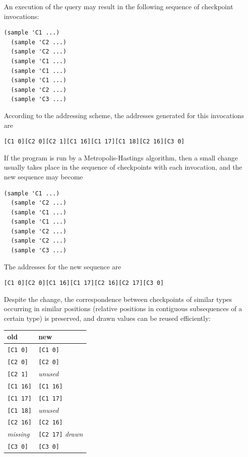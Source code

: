 \documentclass[preprint]{sigplanconf}
\begin{document}
An execution of the query may result in the following
sequence of checkpoint invocations:
\begin{lstlisting}[style=default]
  (sample 'C1 ...)
  (sample 'C2 ...)
  (sample 'C2 ...)
  (sample 'C1 ...)
  (sample 'C1 ...)
  (sample 'C1 ...)
  (sample 'C2 ...)
  (sample 'C3 ...)
\end{lstlisting}
According to the addressing scheme, the addresses generated
for this invocations are
\begin{lstlisting}[style=default]
  [C1 0][C2 0][C2 1][C1 16][C1 17][C1 18][C2 16][C3 0]
\end{lstlisting}
If the program is run by a Metropolis-Hastings algorithm, then a
small change usually takes place in the sequence of checkpoints
with each invocation, and the new sequence may become
\begin{lstlisting}[style=default]
  (sample 'C1 ...)
  (sample 'C2 ...)
  (sample 'C1 ...)
  (sample 'C1 ...)
  (sample 'C2 ...)
  (sample 'C2 ...)
  (sample 'C3 ...)
\end{lstlisting}
The addresses for the new sequence are
\begin{lstlisting}[style=default]
  [C1 0][C2 0][C1 16][C1 17][C2 16][C2 17][C3 0]
\end{lstlisting}
Despite the change, the correspondence between checkpoints of
similar types occurring in similar positions (relative positions
in contiguous subsequences of a certain type) is preserved, and
drawn values can be reused efficiently:

\vspace{\baselineskip}
{
\begin{tabular}{l l}
    \textbf{old} & \textbf{new} \\ \hline
    {}\texttt{[C1 0]} & \texttt{[C1 0]} \\
    {}\texttt{[C2 0]} & \texttt{[C2 0]} \\
    {}\texttt{[C2 1]} & \textit{unused} \\
    {}\texttt{[C1 16]} & \texttt{[C1 16]} \\
    {}\texttt{[C1 17]} & \texttt{[C1 17]} \\
    {}\texttt{[C1 18]} & \textit{unused} \\
    {}\texttt{[C2 16]} & \texttt{[C2 16]} \\
    \textit{missing} & \texttt{[C2 17]} \textit{drawn}\\
    {}\texttt{[C3 0]} & \texttt{[C3 0]}
\end{tabular}
\vspace{\baselineskip}}
\end{document}
